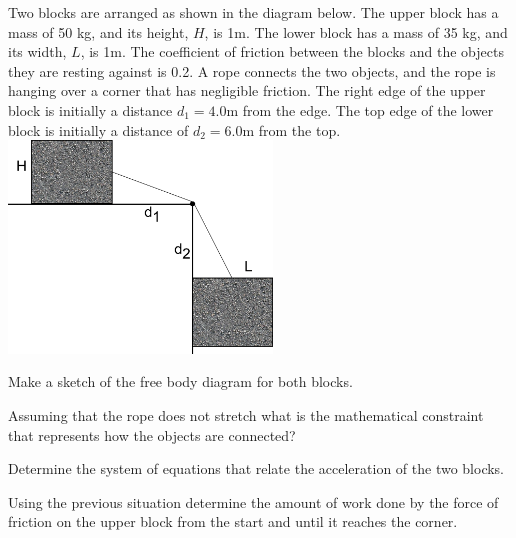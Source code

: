 \begin{problem} 
\item Two blocks are arranged as shown in the diagram below. The upper
  block has a mass of 50 kg, and its height, $H$, is 1m. The lower
  block has a mass of 35 kg, and its width, $L$, is 1m. The
  coefficient of friction between the blocks and the objects they are
  resting against is 0.2. A rope connects the two objects, and the
  rope is hanging over a corner that has negligible friction. The
  right edge of the upper block is initially a distance $d_1=4.0$m
  from the edge. The top edge of the lower block is initially a
  distance of $d_2=6.0$m from the top. \\
  \includegraphics[width=7cm]{ink/week10/hangingBlocks}

  \begin{subproblem}
    \item Make a sketch of the free body diagram for both blocks.
      \vfill
    \item Assuming that the rope does not stretch what is the
      mathematical constraint that represents how the objects are
      connected? 
      \vfill
      \clearpage
    \item Determine the system of equations that relate the
      acceleration of the two blocks.
      \vfill
  \end{subproblem}
\end{problem}

\begin{problem}
\item Using the previous situation determine the amount of work done
  by the force of friction on the upper block from the start and until
  it reaches the corner.

  \vfill

\end{problem}

